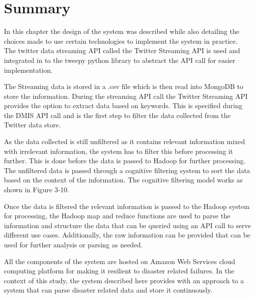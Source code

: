 \section{Summary}

In this chapter the design of the system was described while also detailing the choices made to use certain technologies to implement the system in practice. The twitter data streaming API called the Twitter Streaming API is used and integrated in to the tweepy python library to abstract the API call for easier implementation.

The Streaming data is stored in a .csv file which is then read into MongoDB to store the information. During the streaming API call the Twitter Streaming API provides the option to extract data based on keywords. This is specified during the DMIS API call and is the first step to filter the data collected from the Twitter data store.

As the data collected is still unfiltered as it contains relevant information mixed with irrelevant information, the system has to filter this before processing it further. This is done before the data is passed to Hadoop for further processing. The unfiltered data is passed through a cognitive filtering system to sort the data based on the context of the information. The cognitive filtering model works as shown in Figure 3-10.

Once the data is filtered the relevant information is passed to the Hadoop system for processing, the Hadoop map and reduce functions are used to parse the information and structure the data that can be queried using an API call to serve different use cases. Additionally, the raw information can be provided that can be used for further analysis or parsing as needed.

All the components of the system are hosted on Amazon Web Services cloud computing platform for making it resilient to disaster related failures. In the context of this study, the system described here provides with an approach to a system that can parse disaster related data and store it continuously.